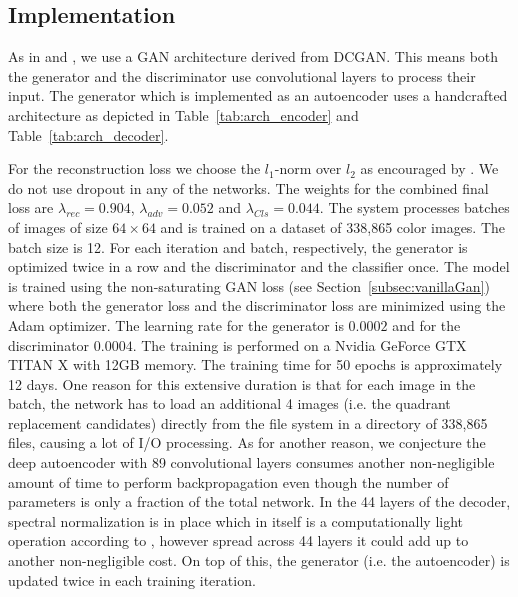 \documentclass[12pt,a4paper]{article}
\begin{document}
\subsection{Implementation}\label{subsec:implementation}
As in \cite{DisentFacOfVarByMixTh} and \cite{InfoGAN}, we use a GAN architecture derived from DCGAN. This means both the generator and the discriminator use convolutional layers to process their input. The generator which is implemented as an autoencoder uses a handcrafted architecture as depicted in Table~\ref{tab:arch_encoder} and Table~\ref{tab:arch_decoder}.


For the reconstruction loss we choose the $l_1$-norm over $l_2$ as encouraged by \cite{CondGAN_PatchGAN}. We do not use dropout in any of the networks. The weights for the combined final loss are $ \lambda_{rec} = 0.904$, $\lambda_{adv} = 0.052$ and $ \lambda_{Cls} = 0.044$. The system processes batches of images of size $64 \times 64$ and is trained on a dataset of 338,865 color images. The batch size is 12. For each iteration and batch, respectively, the generator is optimized twice in a row and the discriminator and the classifier once. The model is trained using the non-saturating GAN loss (see Section~\ref{subsec:vanillaGan}) where both the generator loss and the discriminator loss are minimized using the Adam optimizer. The learning rate for the generator is $0.0002$ and for the discriminator $0.0004$. The training is performed on a Nvidia GeForce GTX TITAN X with 12GB memory. The training time for 50 epochs is approximately 12 days. One reason for this extensive duration is that for each image in the batch, the network has to load an additional 4 images (i.e. the quadrant replacement candidates) directly from the file system in a directory of 338,865 files, causing a lot of I/O processing. As for another reason, we conjecture the deep autoencoder with 89 convolutional layers consumes another non-negligible amount of time to perform backpropagation even though the number of parameters is only a fraction of the total network. In the 44 layers of the decoder, spectral normalization is in place which in itself is a computationally light operation according to \cite{SNGAN}, however spread across 44 layers it could add up to another non-negligible cost. On top of this, the generator (i.e. the autoencoder) is updated twice in each training iteration.
\end{document}
